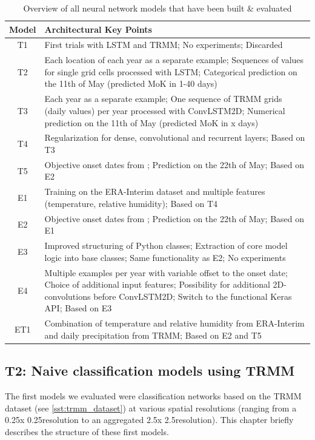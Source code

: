\begin{table}[h]
  \begin{tabularx}{\linewidth}{|c|X|}
    \hline
    Model & Architectural Key Points \\
    \hline
    T1 & First trials with LSTM and TRMM; No experiments; Discarded \\
    T2 & Each location of each year as a separate example; Sequences of values for single grid cells processed with LSTM; Categorical prediction on the 11th of May (predicted MoK in 1-40 days) \\
    T3 & Each year as a separate example; One sequence of TRMM grids (daily values) per year processed with ConvLSTM2D; Numerical prediction on the 11th of May (predicted MoK in x days) \\
    T4 & Regularization for dense, convolutional and recurrent layers; Based on T3 \\
    T5 & Objective onset dates from \citep{Singh.2009}; Prediction on the 22th of May; Based on E2 \\
    \hline
    E1 & Training on the ERA-Interim dataset and multiple features (temperature, relative humidity); Based on T4 \\
    E2 & Objective onset dates from \citep{Singh.2009}; Prediction on the 22th of May; Based on E1 \\
    E3 & Improved structuring of Python classes; Extraction of core model logic into base classes; Same functionality as E2; No experiments \\
    E4 & Multiple examples per year with variable offset to the onset date; Choice of additional input features; Possibility for additional 2D-convolutions before ConvLSTM2D; Switch to the functional Keras API; Based on E3 \\
    \hline
    ET1 & Combination of temperature and relative humidity from ERA-Interim and daily precipitation from TRMM; Based on E2 and T5 \\
    \hline
  \end{tabularx}
  \caption{Overview of all neural network models that have been built \& evaluated}
  \label{tab:nn_overall_summary}
\end{table}

\clearpage
\subsection{T2: Naive classification models using TRMM}
\label{sst:nn_t2}
The first models we evaluated were classification networks based on the TRMM dataset (see \cref{sst:trmm_dataset}) at various spatial resolutions (ranging from a 0.25\degree x 0.25\degree resolution to an aggregated 2.5\degree x 2.5\degree resolution). This chapter briefly describes the structure of these first models.

